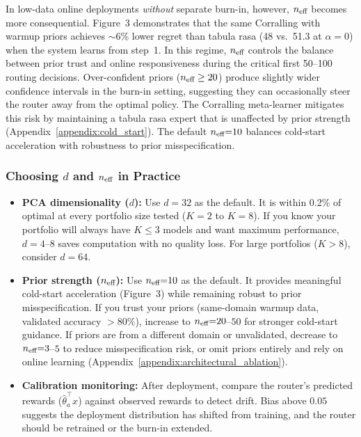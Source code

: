 In low-data online deployments \emph{without} separate burn-in, however,
$n_{\text{eff}}$ becomes more consequential.  Figure~3 demonstrates that the same
Corralling with warmup priors achieves ${\sim}$6\% lower regret than tabula
rasa (48 vs.\ 51.3 at $\alpha{=}0$) when the system learns from step~1.  In this regime, $n_{\text{eff}}$ controls the
balance between prior trust and online responsiveness during the critical
first 50--100 routing decisions.  Over-confident priors ($n_{\text{eff}} \geq 20$)
produce slightly wider confidence intervals in the burn-in setting,
suggesting they can occasionally steer the router away from the optimal
policy.  The Corralling meta-learner mitigates this risk by maintaining a
tabula rasa expert that is unaffected by prior strength
(Appendix~\ref{appendix:cold_start}).  The default $n_{\text{eff}}{=}10$ balances
cold-start acceleration with robustness to prior misspecification.

\subsubsection{Choosing $d$ and $n_{\text{eff}}$ in Practice}

\begin{itemize}[leftmargin=*,noitemsep]
    \item \textbf{PCA dimensionality ($d$):}
          Use $d{=}32$ as the default.  It is within 0.2\% of optimal at
          every portfolio size tested ($K{=}2$ to $K{=}8$).  If you know
          your portfolio will always have $K \leq 3$ models and want maximum
          performance, $d{=}4$--$8$ saves computation with no quality loss.
          For large portfolios ($K{>}8$), consider $d{=}64$.
    \item \textbf{Prior strength ($n_{\text{eff}}$):}
          Use $n_{\text{eff}}{=}10$ as the default.  It provides meaningful
          cold-start acceleration (Figure~3) while remaining robust to
          prior misspecification.  If you trust your priors
          (same-domain warmup data, validated accuracy $>80\%$), increase
          to $n_{\text{eff}}{=}20$--$50$ for stronger cold-start guidance.  If
          priors are from a different domain or unvalidated, decrease to
          $n_{\text{eff}}{=}3$--$5$ to reduce misspecification risk, or omit
          priors entirely and rely on online learning
          (Appendix~\ref{appendix:architectural_ablation}).
    \item \textbf{Calibration monitoring:}  After deployment, compare
          the router's predicted rewards ($\hat{\theta}_a^\top x$) against
          observed rewards to detect drift.  Bias above $0.05$ suggests
          the deployment distribution has shifted from training, and the
          router should be retrained or the burn-in extended.
\end{itemize}


